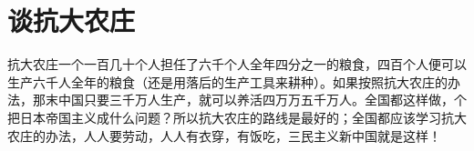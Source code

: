 \section[谈抗大农庄（一九三九年）]{谈抗大农庄}


抗大农庄一个一百几十个人担任了六千个人全年四分之一的粮食，四百个人便可以生产六千人全年的粮食（还是用落后的生产工具来耕种）。如果按照抗大农庄的办法，那末中国只要三千万人生产，就可以养活四万万五千万人。全国都这样做，个把日本帝国主义成什么问题？所以抗大农庄的路线是最好的；全国都应该学习抗大农庄的办法，人人要劳动，人人有衣穿，有饭吃，三民主义新中国就是这样！


